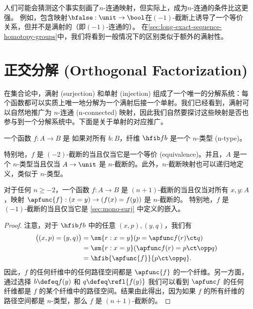 人们可能会猜测这个事实刻画了$n$-连通映射，但实际上，成为$n$-连通的条件比这更强。
例如，包含映射$\bfalse:\unit \to\bool$在$(-1)$-截断上诱导了一个等价关系，但并不是满射的（即$(-1)$-连通的）。
在\cref{sec:long-exact-sequence-homotopy-groups}中，我们将看到一般情况下的区别类似于额外的满射性。

\section{正交分解 (Orthogonal Factorization)}
\label{sec:image-factorization}

%
%

在集合论中，满射 (surjection) 和单射 (injection) 组成了一个唯一的分解系统：每个函数都可以实质上唯一地分解为一个满射后接一个单射。我们已经看到，满射可以自然地推广为 $n$-连通 (n-connected) 映射，因此我们自然要探讨这些映射是否也参与到一个分解系统中。下面是关于单射的对应推广。

\begin{defn}
    一个函数 $f:A\to B$ 是 
    如果对所有 $b:B$，纤维 $\hfib f b$ 是一个 $n$-类型 (n-type)。
\end{defn}

特别地，$f$ 是 $(-2)$-截断的当且仅当它是一个等价 (equivalence)。并且，$A$ 是一个 $n$-类型当且仅当 $A\to\unit$ 是 $n$-截断的。此外，$n$-截断映射也可以递归地定义，类似于 $n$-类型。

\begin{lem}\label{thm:modal-mono}
对于任何 $n\ge -2$，一个函数 $f:A\to B$ 是 $(n+1)$-截断的当且仅当对所有 $x,y:A$，映射 $\apfunc{f}:(x=y) \to (f(x)=f(y))$ 是 $n$-截断的。
%
%
特别地，$f$ 是 $(-1)$-截断的当且仅当它是 \cref{sec:mono-surj} 中定义的嵌入。
\end{lem}
\begin{proof}
    注意，对于 $\hfib f b$ 中的任意 $(x,p),(y,q)$，我们有
    \begin{align*}
        \big((x,p) = (y,q)\big)
        &= \sm{r:x=y} (p = \apfunc f(r)\ct q)\\
        &= \sm{r:x=y} (\apfunc f (r) = p\ct \opp q)\\
        &= \hfib{\apfunc{f}}{p\ct \opp q}.
    \end{align*}
    因此，$f$ 的任何纤维中的任何路径空间都是 $\apfunc{f}$ 的一个纤维。另一方面，通过选择 $b\defeq f(y)$ 和 $q\defeq \refl{f(y)}$ 我们可以看到 $\apfunc f$ 的任何纤维都是 $f$ 的某个纤维中的路径空间。结果由此得出，因为如果 $f$ 的所有纤维的路径空间都是 $n$-类型，那么 $f$ 是 $(n+1)$-截断的。
\end{proof}

